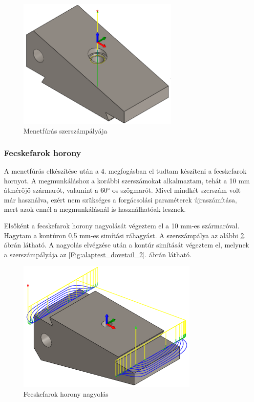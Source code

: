 \documentclass[12pt,a4paper,oneside]{report}
\begin{document}
\begin{figure}[H]
    \centering
    \includegraphics[width=8cm]{figures/alaptest_tap.png}
    \caption{Menetfúrás szerszámpályája}
    \label{Fig:alaptest_tap}
\end{figure}

\subsubsection{Fecskefarok horony}
A menetfúrás elkészítése után a 4. megfogásban el tudtam készíteni a fecskefarok hornyot. A megmunkáláshoz a korábbi szerszámokat alkalmaztam, tehát a 10 mm átmérőjő szármarót, valamint a 60°-os szögmarót. Mivel mindkét szerszám volt már használva, ezért nem szükséges a forgácsolási paraméterek újraszámítása, mert azok ennél a megmunkálásnál is használhatóak lesznek.

Elsőként a fecskefarok horony nagyolását végeztem el a 10 mm-es szármaróval. Hagytam a kontúron 0,5 mm-es simítási ráhagyást. A szerszámpálya az alábbi \ref{Fig:alaptest_dovetail_1}. ábrán látható. A nagyolás elvégzése után a kontúr simítását végeztem el, melynek a szerszámpályája az \ref{Fig:alaptest_dovetail_2}. ábrán látható.

\begin{figure}[H]
    \centering
    \includegraphics[width=9cm]{figures/alaptest_dovetail_1.png}
    \caption{Fecskefarok horony nagyolás}
    \label{Fig:alaptest_dovetail_1}
\end{figure}
\end{document}
